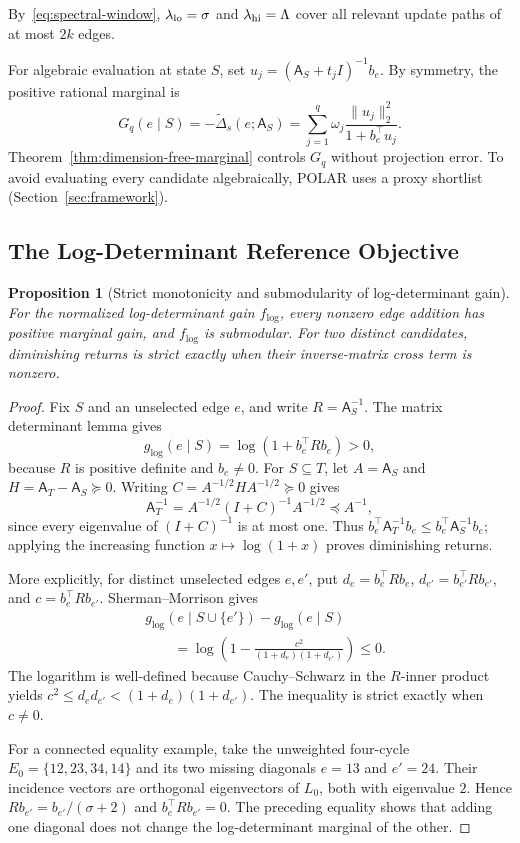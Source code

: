 \documentclass[conference]{IEEEtran}
\newtheorem{proposition}{Proposition}
\theoremstyle{definition}
\newcommand{\POLAR}{\textsc{POLAR}}
\newcommand{\matA}{\mathsf A}
\begin{document}
By~\eqref{eq:spectral-window}, $\lambda_{\rm lo}=\sigma$ and $\lambda_{\rm hi}=\Lambda$
cover all relevant update paths of at most $2k$ edges.

For algebraic evaluation at state $S$, set
$u_j=(\matA_S+t_jI)^{-1}b_e$. By symmetry, the positive
rational marginal is
\[
G_q(e\mid S)=-\widetilde\Delta_s(e;\matA_S)
=\sum_{j=1}^q\omega_j\frac{\|u_j\|_2^2}{1+b_e^\top u_j}.
\]
Theorem~\ref{thm:dimension-free-marginal} controls $G_q$ without
projection error. To avoid evaluating every candidate algebraically,
\POLAR{} uses a proxy shortlist (Section~\ref{sec:framework}).


\subsection{The Log-Determinant Reference Objective}
\begin{proposition}[Strict monotonicity and submodularity of log-determinant gain]
\label{prop:logdet-submodularity}
For the normalized log-determinant gain $f_{\log}$, every nonzero
edge addition has positive marginal gain, and $f_{\log}$ is
submodular. For two distinct candidates, diminishing returns is
strict exactly when their inverse-matrix cross term is nonzero.
\end{proposition}
\begin{proof}
Fix $S$ and an unselected edge $e$, and write $R=\matA_{S}^{-1}$.
The matrix determinant lemma gives
\[
g_{\log}(e\mid S)=\log(1+b_e^\top Rb_e)>0,
\]
because $R$ is positive definite and $b_e\ne0$.
For $S\subseteq T$, let $A=\matA_{S}$ and $H=\matA_{T}-\matA_{S}\succeq0$.
Writing $C=A^{-1/2}HA^{-1/2}\succeq0$ gives
\[
\matA_{T}^{-1}=A^{-1/2}(I+C)^{-1}A^{-1/2}\preceq A^{-1},
\]
since every eigenvalue of $(I+C)^{-1}$ is at most one.
Thus $b_e^\top \matA_{T}^{-1}b_e\le b_e^\top \matA_{S}^{-1}b_e$;
applying the increasing function $x\mapsto\log(1+x)$ proves diminishing returns.

More explicitly, for distinct unselected edges $e,{e'}$, put
$d_e=b_e^\top Rb_e$, $d_{e'}=b_{e'}^\top Rb_{e'}$, and $c=b_e^\top Rb_{e'}$.
Sherman--Morrison gives
\[
\begin{aligned}
&g_{\log}(e\mid S\cup\{{e'}\})-g_{\log}(e\mid S)\\
&\qquad=\log\left(1-\frac{c^2}{(1+d_e)(1+d_{e'})}\right)\le0.
\end{aligned}
\]
The logarithm is well-defined because Cauchy--Schwarz in the $R$-inner product yields
$c^2\le d_ed_{e'}<(1+d_e)(1+d_{e'})$.
The inequality is strict exactly when $c\ne0$.

For a connected equality example, take the unweighted four-cycle
$E_0=\{12,23,34,14\}$ and its two missing diagonals $e=13$ and ${e'}=24$.
Their incidence vectors are orthogonal eigenvectors of $L_0$, both with eigenvalue $2$.
Hence $Rb_{e'}=b_{e'}/(\sigma+2)$ and $b_e^\top Rb_{e'}=0$.
The preceding equality shows that adding one diagonal does not change the log-determinant marginal of the other.
\end{proof}
\end{document}
